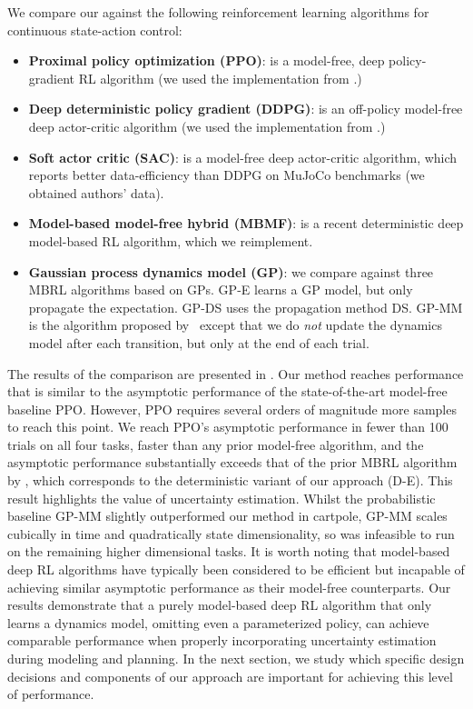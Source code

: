 We compare our  against the following reinforcement learning algorithms for continuous state-action control: 
\begin{itemize}[leftmargin=15pt]
    \item \textbf{Proximal policy optimization (PPO)}: \citep{schulman2017proximal} is a model-free, deep policy-gradient RL algorithm (we used the implementation from \cite{baselines}.)
    \item \textbf{Deep deterministic policy gradient (DDPG)}: \citep{Lillicrap2016} is an off-policy model-free deep actor-critic algorithm (we used the implementation from \cite{baselines}.)
    \item \textbf{Soft actor critic (SAC)}: \citep{Haarnoja2018softUpdated} is a model-free deep actor-critic algorithm, which reports better data-efficiency than DDPG on MuJoCo benchmarks (we obtained authors' data).
\item \textbf{Model-based model-free hybrid (MBMF)}: \citep{Nagabandi2017} is a recent deterministic deep model-based RL algorithm, which we reimplement.
    \item \textbf{Gaussian process dynamics model (GP)}: we compare against three MBRL algorithms based on GPs. GP-E learns a GP model, but only propagate the expectation. GP-DS uses the propagation method DS. GP-MM is the algorithm proposed by~\cite{Kamthe2018} except that we do \textit{not} update the dynamics model after each transition, but only at the end of each trial.
\end{itemize}
%
The results of the comparison are presented in . 
Our method reaches performance that is similar to the asymptotic performance of the state-of-the-art model-free baseline PPO. 
However, PPO requires several orders of magnitude more samples to reach this point.
We reach PPO's asymptotic performance in fewer than 100 trials on all four tasks, faster than any prior model-free algorithm, and the asymptotic performance substantially exceeds that of the prior MBRL algorithm by \cite{Nagabandi2017}, which corresponds to the deterministic variant of our approach (D-E).
This result highlights the value of uncertainty estimation. 
Whilst the probabilistic baseline GP-MM slightly outperformed our method in cartpole, GP-MM scales cubically in time and quadratically state dimensionality, so was infeasible to run on the remaining higher dimensional tasks.
It is worth noting that model-based deep RL algorithms have typically been considered to be efficient but incapable of achieving similar asymptotic performance as their model-free counterparts. 
Our results demonstrate that a purely model-based deep RL algorithm that only learns a dynamics model, omitting even a parameterized policy, can achieve comparable performance when properly incorporating uncertainty estimation during modeling and planning. 
In the next section, we study which specific design decisions and components of our approach are important for achieving this level of performance.
    
